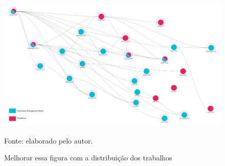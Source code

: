 \begin{figure}[H]
	\centering	
	\caption{Melhorar essa figura com a distribuição dos trabalhos} 
	\label{fig:cap3divisaodostrabalhos}
	\noindent\includegraphics[width=1\linewidth]{Imagens/cap3/divisaodostrabalhos.jpg} 
	
	Fonte: elaborado pelo autor.
\end{figure}

